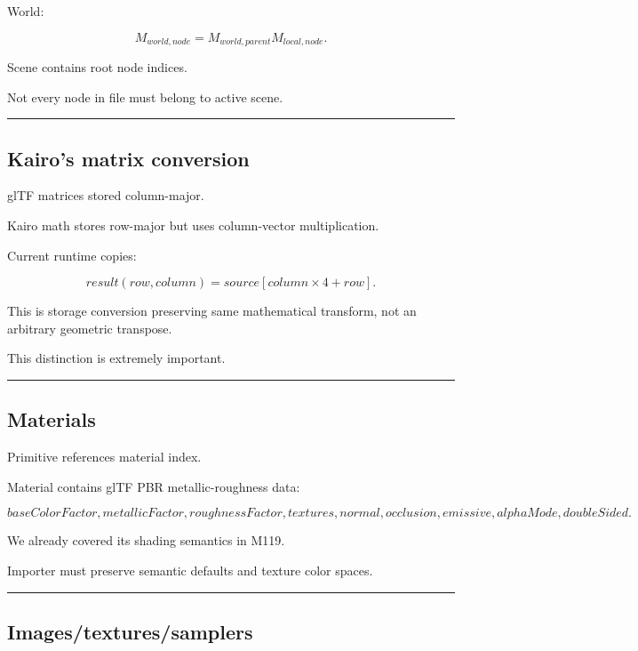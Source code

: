 World:

\[
\boxed{
M_{world,node}
=
M_{world,parent}
M_{local,node}.
}
\]

Scene contains root node indices.

Not every node in file must belong to active scene.

\begin{center}\rule{0.5\linewidth}{0.5pt}\end{center}

\subsection{Kairo's matrix conversion}\label{04-visual-computing-ii-ch041-kairos-matrix-conversion}

glTF matrices stored column-major.

Kairo math stores row-major but uses column-vector multiplication.

Current runtime copies:

\[
result(row,column)
=
source[column\times4+row].
\]

This is storage conversion preserving same mathematical transform, not an arbitrary geometric transpose.

This distinction is extremely important.

\begin{center}\rule{0.5\linewidth}{0.5pt}\end{center}

\subsection{Materials}\label{04-visual-computing-ii-ch041-materials}

Primitive references material index.

Material contains glTF PBR metallic-roughness data:

\[
baseColorFactor,
metallicFactor,
roughnessFactor,
textures,
normal,
occlusion,
emissive,
alphaMode,
doubleSided.
\]

We already covered its shading semantics in M119.

Importer must preserve semantic defaults and texture color spaces.

\begin{center}\rule{0.5\linewidth}{0.5pt}\end{center}

\subsection{Images/textures/samplers}\label{04-visual-computing-ii-ch041-imagestexturessamplers}

